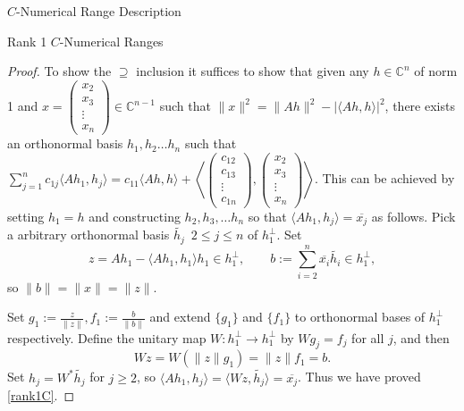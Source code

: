 \documentclass[12pt]{article}
\theoremstyle{plain}
\theoremstyle{definition}
\theoremstyle{remark}
\numberwithin{equation}{section}
\begin{document}
\begin{section}{$C$-Numerical Range Description}
\begin{subsection}{Rank 1 $C$-Numerical Ranges}
\begin{proof}
To show the $\supseteq$ inclusion it suffices to show that given any $h \in \mathbb{C}^n$ of norm 1 and $x=\begin{pmatrix}
        x_2 \\
        x_3 \\
        \vdots \\
        x_n
    \end{pmatrix} \in \mathbb{C}^{n-1}$ such that $\|x\|^2 = \|Ah\|^2 - |\langle Ah,h\rangle |^2$, there exists an orthonormal basis $h_1, h_2 \ldots h_n$ such that $\sum_{j=1}^n c_{1j}\langle Ah_1,h_j \rangle  = c_{11} \langle Ah,h \rangle + \left\langle \begin{pmatrix}
            c_{12} \\
            c_{13} \\
            \vdots \\
            c_{1n}
        \end{pmatrix}, \begin{pmatrix}
            x_{2} \\
            x_{3} \\
            \vdots \\
            x_{n}
        \end{pmatrix} \right\rangle$. This can be achieved by setting $h_1 = h$ and constructing $h_2, h_3, \ldots h_n$ so that $\langle Ah_1,h_j\rangle = \overline{x_j}$ as follows. Pick a arbitrary orthonormal basis $\tilde{h_j} \, \,  \,  2 \leq j \leq n $ of $h_1^{\perp}$. Set
\[
z = Ah_1 - \langle Ah_1, h_1 \rangle h_1 \in h_1^{\perp}, 
\qquad 
b := \sum_{i=2}^n \overline{x_i} \tilde{h_i} \in h_1^{\perp},
\]
so $\|b\| = \|x\| = \|z\|$.

Set $g_1 := \frac{z}{\|z\|}, f_1 := \frac{b}{\|b\|} $ and extend $\{g_1\}$ and $\{f_1\}$ to orthonormal bases of $h_1^{\perp}$ respectively.
Define the unitary map $W:h_1^{\perp} \to h_1^{\perp}$ by $W g_j = f_j$ for all $j$, and then
\[
W z = W(\|z\| g_1) = \|z\| f_1 = b.
\]
Set $h_j = W^* \tilde{h_j}$ for $j\geq 2$, so $\langle Ah_1, h_j\rangle = \langle Wz, \tilde{h_j} \rangle  = \overline{x_j}$. Thus we have proved \eqref{rank1C}.



\end{proof}
\end{subsection}
\end{section}
\end{document}
